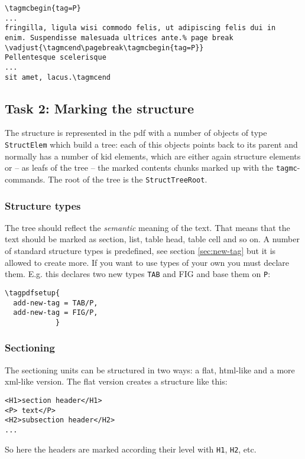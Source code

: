 \documentclass[DIV=12,parskip=half-,bibliography=totoc]{scrartcl}
\begin{document}
\begin{lstlisting}
\tagmcbegin{tag=P}
...
fringilla, ligula wisi commodo felis, ut adipiscing felis dui in
enim. Suspendisse malesuada ultrices ante.% page break
\vadjust{\tagmcend\pagebreak\tagmcbegin{tag=P}}
Pellentesque scelerisque
...
sit amet, lacus.\tagmcend
\end{lstlisting}


\subsection{Task 2: Marking the structure}
The structure is represented in the pdf with a number of objects of type \texttt{StructElem} which build a tree: each of this objects points back to its parent and normally has a number of kid elements, which are either again structure elements or -- as leafs of the tree -- the marked contents chunks marked up with the \verb+tagmc+-commands. The root of the tree is the \texttt{StructTreeRoot}.

\subsubsection{Structure types}
The tree should reflect the \emph{semantic} meaning of the text. That means that the text should be marked as section, list, table head, table cell and so on. A number of standard structure types is predefined, see section \ref{sec:new-tag} but it is allowed to create more. If you want to use types of your own you must declare them. E.g. this declares two new types \texttt{TAB} and {FIG} and base them on \texttt{P}:

\begin{lstlisting}
\tagpdfsetup{
  add-new-tag = TAB/P,
  add-new-tag = FIG/P,
            }
\end{lstlisting}

\subsubsection{Sectioning}
The sectioning units can be structured in two ways: a flat, html-like and a more xml-like version.
The flat version creates a structure like this:

\begin{lstlisting}
<H1>section header</H1>
<P> text</P>
<H2>subsection header</H2>
...
\end{lstlisting}

So here the headers are marked according their level with \texttt{H1}, \texttt{H2}, etc.
\end{document}
